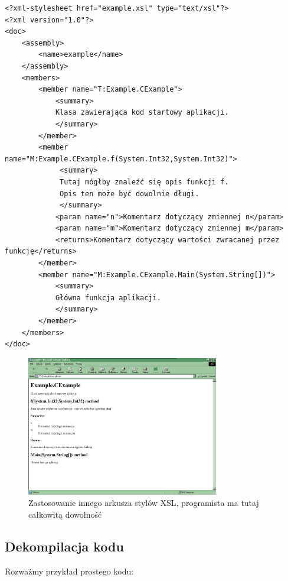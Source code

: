 \begin{scriptsize}
\begin{verbatim}
<?xml-stylesheet href="example.xsl" type="text/xsl"?> 
<?xml version="1.0"?>
<doc>
    <assembly>
        <name>example</name>
    </assembly>
    <members>
        <member name="T:Example.CExample">
            <summary>
            Klasa zawierająca kod startowy aplikacji.
            </summary>
        </member>
        <member name="M:Example.CExample.f(System.Int32,System.Int32)">
             <summary>
             Tutaj mógłby znaleźć się opis funkcji f.
             Opis ten może być dowolnie długi.
             </summary> 
            <param name="n">Komentarz dotyczący zmiennej n</param>
            <param name="m">Komentarz dotyczący zmiennej m</param>
            <returns>Komentarz dotyczący wartości zwracanej przez funkcję</returns>
        </member>
        <member name="M:Example.CExample.Main(System.String[])">
            <summary>
            Główna funkcja aplikacji.
            </summary>
        </member>
    </members>
</doc>
\end{verbatim}
\end{scriptsize}

\begin{figure}
\begin{center}
\includegraphics[width=0.75\textwidth]{./pic/w02}
\caption{Zastosowanie innego arkusza stylów XSL, programista ma tutaj całkowitą dowolność}
\end{center}
\end{figure}

\subsection{Dekompilacja kodu}
\label{csDekompilacja}

Rozważmy przykład prostego kodu:

